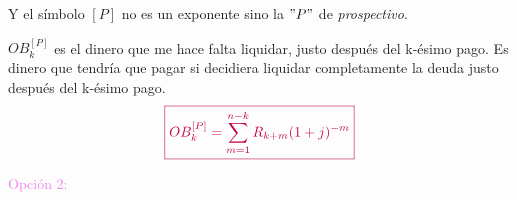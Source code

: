 Y el símbolo $[P]$ no es un exponente sino la $"P"$ de \textit{prospectivo}.

$OB_k^{[P]}$ es el dinero que me hace falta liquidar, justo después del k-ésimo pago. Es dinero que tendría que pagar si decidiera liquidar completamente la deuda justo después del k-ésimo pago.
$$\textcolor{purple}{\boxed{OB_k^{[P]} = \sum_{m=1}^{n-k} R_{k+m}(1+j)^{-m}}}$$

\textcolor{violet}{Opción 2:}\\
\begin{center}
    


\begin{tikzpicture}[x=0.75pt,y=0.75pt,yscale=-1,xscale=1]


\end{tikzpicture}
\end{center}
